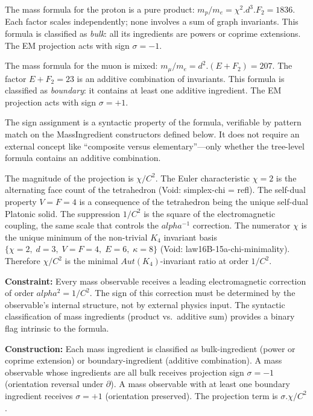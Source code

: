 \documentclass[11pt,a4paper]{book}
\def\alpha{alpha}%
\def\cdot{.}%
\def\mathrm#1{#1}%
\def\texttt#1{#1}%
\begin{document}
The mass formula for the proton is a pure product:
$m_p / m_e = \chi^2 \cdot d^3 \cdot F_2 = 1836$.  Each factor scales
independently; none involves a sum of graph invariants.  This formula
is classified as \emph{bulk}: all its ingredients are powers or coprime
extensions.  The EM projection acts with sign $\sigma = -1$.

The mass formula for the muon is mixed:
$m_\mu / m_e = d^2 \cdot (E + F_2) = 207$.  The factor $E + F_2 = 23$ is an
additive combination of invariants.  This formula is classified as
\emph{boundary}: it contains at least one additive ingredient.
The EM projection acts with sign $\sigma = +1$.

The sign assignment is a syntactic property of the formula, verifiable
by pattern match on the \texttt{MassIngredient} constructors defined
below.  It does not require an external concept like ``composite
versus elementary''---only whether the tree-level formula contains
an additive combination.

The magnitude of the projection is $\chi / C^2$.  The Euler
characteristic $\chi = 2$ is the alternating face count of the tetrahedron
(Void: \texttt{simplex-chi = refl}).  The self-dual property $V = F = 4$
is a consequence of the tetrahedron being the unique self-dual Platonic
solid.
The suppression $1/C^2$ is the square of the
electromagnetic coupling, the same scale that controls the
$\alpha^{-1}$ correction.  The numerator $\chi$ is the unique
minimum of the non-trivial $K_4$ invariant basis
$\{\chi{=}2,\; d{=}3,\; V{=}F{=}4,\; E{=}6,\; \kappa{=}8\}$
(Void: \texttt{law16B-15a-chi-minimality}).  Therefore $\chi / C^2$
is the minimal $\mathrm{Aut}(K_4)$-invariant ratio at order $1/C^2$.

\medskip
\noindent
\textbf{Constraint:}
Every mass observable receives a leading electromagnetic correction of
order $\alpha^2 = 1/C^2$.  The sign of this correction must be determined
by the observable's internal structure, not by external physics input.
The syntactic classification of mass ingredients (product vs.\ additive
sum) provides a binary flag intrinsic to the formula.

\medskip
\noindent
\textbf{Construction:}
Each mass ingredient is classified as \texttt{bulk-ingredient}
(power or coprime extension) or \texttt{boundary-ingredient}
(additive combination).  A mass observable whose ingredients are
all bulk receives projection sign $\sigma = -1$ (orientation reversal
under $\partial$).  A mass observable with at least one boundary ingredient
receives $\sigma = +1$ (orientation preserved).  The projection term is
$\sigma \cdot \chi / C^2$.
\end{document}
